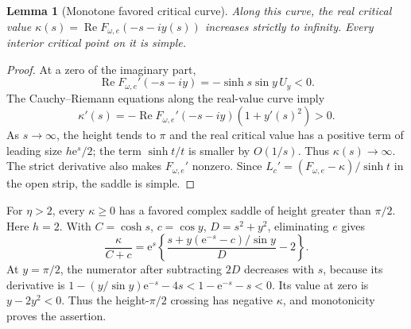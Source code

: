 \documentclass[11pt,a4paper]{article}
\numberwithin{equation}{section}
\newtheorem{lemma}[theorem]{Lemma}
\theoremstyle{definition}
\theoremstyle{plain}
\newcommand{\ee}{\mathrm e}
\begin{document}
\begin{lemma}[Monotone favored critical curve]\label{pte:as:criticalcurve}
Along this curve, the real critical value
$\kappa(s)=\operatorname{Re}F_{\omega,e}(-s-iy(s))$ increases strictly to infinity. Every interior critical point on it is simple.
\end{lemma}
\begin{proof}
At a zero of the imaginary part,
\[
 \operatorname{Re}F_{\omega,e}'(-s-iy)=-\sinh s\sin y\,U_y<0.
\]
The Cauchy--Riemann equations along the real-value curve imply
\[
 \kappa'(s)=-\operatorname{Re}F_{\omega,e}'(-s-iy)(1+y'(s)^2)>0.
\]
As $s\to\infty$, the height tends to $\pi$ and the real critical value has a positive term of leading size $h\ee^s/2$; the term $\sinh t/t$ is smaller by $O(1/s)$. Thus $\kappa(s)\to\infty$. The strict derivative also makes $F_{\omega,e}'$ nonzero. Since $L_c'=(F_{\omega,e}-\kappa)/\sinh t$ in the open strip, the saddle is simple.
\end{proof}

For $\eta>2$, every $\kappa\ge0$ has a favored complex saddle of height greater than $\pi/2$. Here $h=2$. With $C=\cosh s$, $c=\cos y$, $D=s^2+y^2$, eliminating $e$ gives
\begin{equation}\label{pte:as:elimination}
 \frac\kappa{C+c}
 =\ee^s\left\{\frac{s+y(\ee^{-s}-c)/\sin y}{D}-2\right\}.
\end{equation}
At $y=\pi/2$, the numerator after subtracting $2D$ decreases with $s$, because its derivative is
$1-(y/\sin y)\ee^{-s}-4s<1-\ee^{-s}-s<0$.
Its value at zero is $y-2y^2<0$. Thus the height-$\pi/2$ crossing has negative $\kappa$, and monotonicity proves the assertion.
\end{document}

